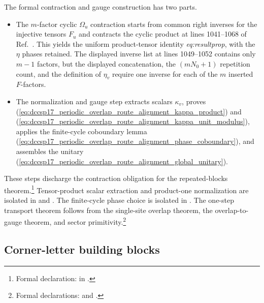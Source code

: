 \documentclass{article}
\begin{document}
The formal contraction and gauge construction has two parts.
\begin{itemize}
    \item The $m$-factor cyclic $\Omega_u$ contraction starts from common right
    inverses for the injective tensors $F_u$ and contracts the cyclic product
    at lines 1041--1068 of Ref.~\cite{DeLasCuevas2017Irreducible}. This yields
    the uniform product-tensor identity \emph{eq:resultprop}, with the $\eta$
    phases retained. The displayed inverse list at lines 1049--1052 contains
    only $m-1$ factors, but the displayed concatenation, the $(mN_0+1)$
    repetition count, and the definition of $\eta_v$ require one inverse for
    each of the $m$ inserted $F$-factors.

    \item The normalization and gauge step extracts scalars $\kappa_v$,
    proves (\ref{eq:dccsp17_periodic_overlap_route_alignment_kappa_product})
    and
    (\ref{eq:dccsp17_periodic_overlap_route_alignment_kappa_unit_modulus}),
    applies the finite-cycle coboundary lemma
    (\ref{eq:dccsp17_periodic_overlap_route_alignment_phase_coboundary}), and
    assembles the unitary
    (\ref{eq:dccsp17_periodic_overlap_route_alignment_global_unitary}).
\end{itemize}
These steps discharge the contraction obligation for the repeated-blocks
theorem.\footnote{Formal declaration:
 in
.} Tensor-product scalar extraction and
product-one normalization are isolated in
 and
.
The finite-cycle phase choice is isolated in
.
The one-step transport theorem follows from the single-site overlap theorem,
the overlap-to-gauge theorem, and sector primitivity.\footnote{Formal
declarations:
 and
.}

\subsection{Corner-letter building blocks}
\end{document}
